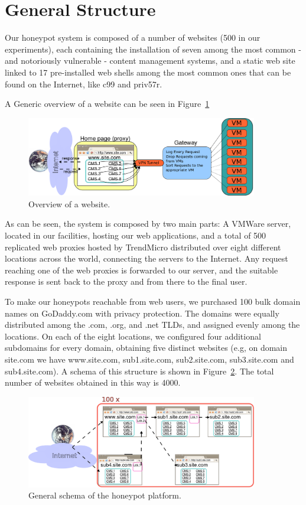 \section{General Structure}

Our honeypot system is composed of a number of websites (500 in our experiments), each containing the installation of seven among the most common - and notoriously vulnerable - content management systems, and a static web site linked to 17 pre-installed web shells among the most common ones that can be found on the Internet, like c99 and priv57r.

A Generic overview of a website can be seen in Figure~\ref{fig:websiteView}

\begin{figure}[tbh]
\centerline{\includegraphics[width=0.9\textwidth]{Images/websiteOverview.png}}
\caption{Overview of a website.\label{fig:websiteView}}
\end{figure}

As can be seen, the system is composed by two main parts: A VMWare server, located in our facilities, hosting our web applications, and a total of 500 replicated web proxies hosted by TrendMicro distributed over eight different locations across the world, connecting the servers to the Internet. Any request reaching one of the web proxies is forwarded to our server, and the suitable response is sent back to the proxy and from there to the final user.

To make our honeypots reachable from web users, we purchased 100 bulk domain names on GoDaddy.com with privacy protection. The domains were equally distributed among the .com, .org, and .net TLDs, and assigned evenly among the locations.
On each of the eight locations, we configured four additional subdomains for every domain, obtaining five distinct websites (e.g, on domain site.com we have www.site.com, sub1.site.com, sub2.site.com, sub3.site.com and sub4.site.com). A schema of this structure is shown in Figure~\ref{fig:genSchema}. The total number of websites obtained in this way is 4000.

\begin{figure}[tbh]
\centerline{\includegraphics[width=0.9\textwidth]{Images/GeneralSchema.png}}
\caption{General schema of the honeypot platform.\label{fig:genSchema}}
\end{figure}

